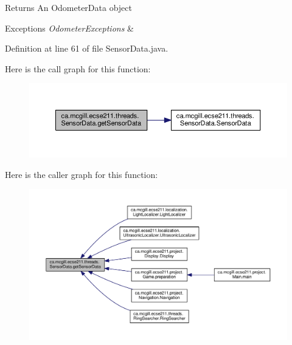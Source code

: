 \begin{DoxyReturn}{Returns}
An Odometer\+Data object 
\end{DoxyReturn}

\begin{DoxyExceptions}{Exceptions}
{\em Odometer\+Exceptions} & \\
\hline
\end{DoxyExceptions}


Definition at line 61 of file Sensor\+Data.\+java.

Here is the call graph for this function\+:
\nopagebreak
\begin{figure}[H]
\begin{center}
\leavevmode
\includegraphics[width=350pt]{classca_1_1mcgill_1_1ecse211_1_1threads_1_1_sensor_data_a8260aba53b4474ca1275e4ce26157977_cgraph}
\end{center}
\end{figure}
Here is the caller graph for this function\+:
\nopagebreak
\begin{figure}[H]
\begin{center}
\leavevmode
\includegraphics[width=350pt]{classca_1_1mcgill_1_1ecse211_1_1threads_1_1_sensor_data_a8260aba53b4474ca1275e4ce26157977_icgraph}
\end{center}
\end{figure}
\mbox{\label{classca_1_1mcgill_1_1ecse211_1_1threads_1_1_sensor_data_a35b1941d44e86b81eb7c625efbd3c8ba}} 
